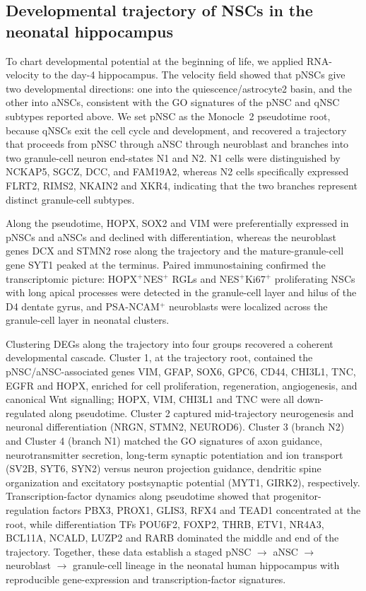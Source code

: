 \documentclass[11pt]{article}
\begin{document}
\subsection{Developmental trajectory of NSCs in the neonatal hippocampus}

To chart developmental potential at the beginning of life, we applied
RNA-velocity \cite{lamanno2018rna} to the day-4 hippocampus. The velocity
field showed that pNSCs give two developmental directions: one into the
quiescence/astrocyte2 basin, and the other into aNSCs, consistent with the
GO signatures of the pNSC and qNSC subtypes reported above. We set pNSC as
the Monocle~2 \cite{trapnell2014dynamics} pseudotime root, because qNSCs
exit the cell cycle and development, and recovered a trajectory that
proceeds from pNSC through aNSC through neuroblast and branches into two
granule-cell neuron end-states N1 and N2. N1 cells were distinguished by
NCKAP5, SGCZ, DCC, and FAM19A2, whereas N2 cells specifically expressed
FLRT2, RIMS2, NKAIN2 and XKR4, indicating that the two branches represent
distinct granule-cell subtypes.

Along the pseudotime, HOPX, SOX2 and VIM were preferentially expressed in
pNSCs and aNSCs and declined with differentiation, whereas the neuroblast
genes DCX and STMN2 rose along the trajectory and the mature-granule-cell
gene SYT1 peaked at the terminus. Paired immunostaining confirmed the
transcriptomic picture: HOPX$^+$NES$^+$ RGLs and NES$^+$Ki67$^+$
proliferating NSCs with long apical processes were detected in the
granule-cell layer and hilus of the D4 dentate gyrus, and PSA-NCAM$^+$
neuroblasts were localized across the granule-cell layer in neonatal
clusters.

Clustering DEGs along the trajectory into four groups recovered a coherent
developmental cascade. Cluster 1, at the trajectory root, contained the
pNSC/aNSC-associated genes VIM, GFAP, SOX6, GPC6, CD44, CHI3L1, TNC, EGFR
and HOPX, enriched for cell proliferation, regeneration, angiogenesis, and
canonical Wnt signalling; HOPX, VIM, CHI3L1 and TNC were all down-regulated
along pseudotime. Cluster 2 captured mid-trajectory neurogenesis and
neuronal differentiation (NRGN, STMN2, NEUROD6). Cluster 3 (branch N2)
and Cluster 4 (branch N1) matched the GO signatures of axon guidance,
neurotransmitter secretion, long-term synaptic potentiation and ion
transport (SV2B, SYT6, SYN2) versus neuron projection guidance, dendritic
spine organization and excitatory postsynaptic potential (MYT1, GIRK2),
respectively. Transcription-factor dynamics along pseudotime showed that
progenitor-regulation factors PBX3, PROX1, GLIS3, RFX4 and TEAD1
concentrated at the root, while differentiation TFs POU6F2, FOXP2, THRB,
ETV1, NR4A3, BCL11A, NCALD, LUZP2 and RARB dominated the middle and end of
the trajectory. Together, these data establish a staged pNSC $\rightarrow$
aNSC $\rightarrow$ neuroblast $\rightarrow$ granule-cell lineage in the
neonatal human hippocampus with reproducible gene-expression and
transcription-factor signatures.
\end{document}
